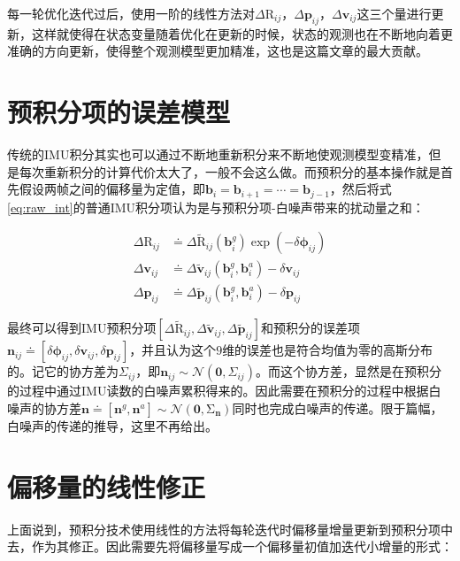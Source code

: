 每一轮优化迭代过后，使用一阶的线性方法对$\Delta\mathrm{R}_{ij}$，$\Delta\bm{p}_{ij}$，$\Delta\bm{v}_{ij}$这三个量进行更新，这样就使得在状态变量随着优化在更新的时候，状态的观测也在不断地向着更准确的方向更新，使得整个观测模型更加精准，这也是这篇文章的最大贡献。

\section{预积分项的误差模型}

传统的IMU积分其实也可以通过不断地重新积分来不断地使观测模型变精准，但是每次重新积分的计算代价太大了，一般不会这么做。而预积分的基本操作就是首先假设两帧之间的偏移量为定值，即$\bm{b}_i = \bm{b}_{i+1} = \cdots = \bm{b}_{j-1}$，然后将式\eqref{eq:raw_int}的普通IMU积分项认为是与预积分项-白噪声带来的扰动量之和：

\begin{equation}
\begin{aligned}
    \Delta\mathrm{R}_{ij} &\doteq
        \Delta\tilde{\mathrm R}_{ij}(\bm{b}^g_i) \exp(-\delta\bm\phi_{ij}) \\
    \Delta\bm{v}_{ij} &\doteq
        \Delta\tilde{\bm v}_{ij}(\bm{b}^g_i, \bm{b}^a_i) - \delta\bm{v}_{ij} \\
    \Delta\bm{p}_{ij} &\doteq
        \Delta\tilde{\bm p}_{ij}(\bm{b}^g_i, \bm{b}^a_i) - \delta\bm{p}_{ij}
\end{aligned}
\end{equation}

最终可以得到IMU预积分项$\left[\Delta\tilde{\mathrm R}_{ij},\Delta\tilde{\bm v}_{ij},\Delta\tilde{\bm p}_{ij}\right]$和预积分的误差项$\bm{n}_{ij} \doteq \left[\delta\bm\phi_{ij},\delta\bm{v}_{ij},\delta\bm{p}_{ij}\right]$，并且认为这个$9$维的误差也是符合均值为零的高斯分布的。记它的协方差为$\Sigma_{ij}$，即$\bm{n}_{ij} \sim \mathcal{N}\left(\bm{0},\Sigma_{ij}\right)$。而这个协方差，显然是在预积分的过程中通过IMU读数的白噪声累积得来的。因此需要在预积分的过程中根据白噪声的协方差$\bm{n} \doteq \left[\bm{n}^g,\bm{n}^a\right] \sim \mathcal{N}(\bm{0},\mathrm\Sigma_{\bm{n}})$同时也完成白噪声的传递。限于篇幅，白噪声的传递的推导，这里不再给出。

\section{偏移量的线性修正}

上面说到，预积分技术使用线性的方法将每轮迭代时偏移量增量更新到预积分项中去，作为其修正。因此需要先将偏移量写成一个偏移量初值加迭代小增量的形式：

